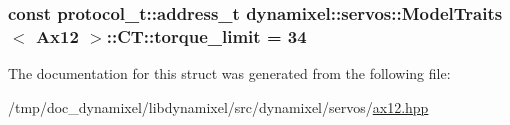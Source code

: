 \subsubsection[{\texorpdfstring{torque\+\_\+limit}{torque_limit}}]{\setlength{\rightskip}{0pt plus 5cm}const {\bf protocol\+\_\+t\+::address\+\_\+t} {\bf dynamixel\+::servos\+::\+Model\+Traits}$<$ {\bf Ax12} $>$\+::C\+T\+::torque\+\_\+limit = 34\hspace{0.3cm}{\ttfamily [static]}}\hypertarget{structdynamixel_1_1servos_1_1_model_traits_3_01_ax12_01_4_1_1_c_t_a1ab6f1b0cb3adf858747828c5011c7c2}{}\label{structdynamixel_1_1servos_1_1_model_traits_3_01_ax12_01_4_1_1_c_t_a1ab6f1b0cb3adf858747828c5011c7c2}


The documentation for this struct was generated from the following file\+:\begin{DoxyCompactItemize}
\item 
/tmp/doc\+\_\+dynamixel/libdynamixel/src/dynamixel/servos/\hyperlink{ax12_8hpp}{ax12.\+hpp}\end{DoxyCompactItemize}
